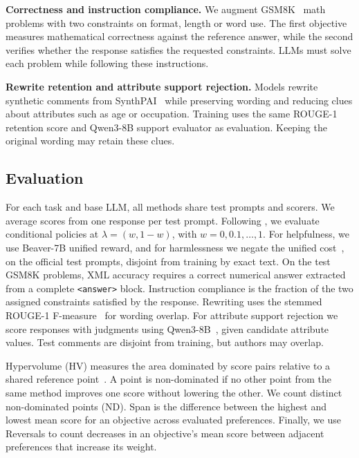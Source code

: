 \documentclass{article} %
\begin{document}
\textbf{Correctness and instruction compliance.} We augment GSM8K~\citep{cobbe2021gsm8k} math problems with two constraints on format, length or word use. The first objective measures mathematical correctness against the reference answer, while the second verifies whether the response satisfies the requested constraints. LLMs must solve each problem while following these instructions.

\textbf{Rewrite retention and attribute support rejection.} Models rewrite synthetic comments from SynthPAI~\citep{yukhymenko2024synthetic} while preserving wording and reducing clues about attributes such as age or occupation. Training uses the same ROUGE-1 retention score and Qwen3-8B support evaluator as evaluation. Keeping the original wording may retain these clues.



\subsection{Evaluation}

For each task and base LLM, all methods share test prompts and scorers. We average scores from one response per test prompt. Following \citet{zhong2024panacea}, we evaluate conditional policies at $\lambda=(w,1-w)$, with $w=0,0.1,\ldots,1$. For helpfulness, we use Beaver-7B unified reward, and for harmlessness we negate the unified cost~\citep{dai2024saferlhf}, on the official test prompts, disjoint from training by exact text. On the test GSM8K problems, XML accuracy requires a correct numerical answer extracted from a complete \texttt{<answer>} block. Instruction compliance is the fraction of the two assigned constraints satisfied by the response. Rewriting uses the stemmed ROUGE-1 F-measure~\citep{lin2004rouge} for wording overlap. For attribute support rejection we score responses with judgments using Qwen3-8B~\citep{qwen3technicalreport}, given candidate attribute values. Test comments are disjoint from training, but authors may overlap.

Hypervolume (HV) measures the area dominated by score pairs relative to a shared reference point~\citep{zitzler1999multiobjective}. A point is non-dominated if no other point from the same method improves one score without lowering the other. We count distinct non-dominated points (ND). Span is the difference between the highest and lowest mean score for an objective across evaluated preferences. Finally, we use Reversals to count decreases in an objective's mean score between adjacent preferences that increase its weight. %
\end{document}

